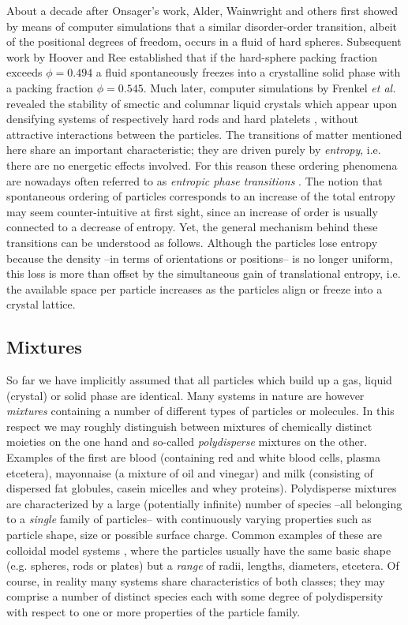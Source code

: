 \documentclass[amssymb]{revtex4}
\begin{document}
About a decade after Onsager's work, Alder, Wainwright and others \cite{ALDER57,WOOD57} first showed by means of computer simulations that
a similar disorder-order transition, albeit of the positional degrees of freedom, occurs in a fluid of hard spheres. Subsequent work by
Hoover and Ree \cite{HooverRee} established that if the hard-sphere packing fraction  
exceeds $\phi=0.494$ a fluid  spontaneously freezes into a crystalline 
solid phase with a packing fraction $\phi=0.545$.
Much later, computer simulations by Frenkel {\em et al.}  revealed the stability
of smectic and columnar liquid crystals which appear upon densifying systems of respectively hard rods \cite{Frenkel88} and 
 hard platelets \cite{FrenkelLiqcryst,Veerman},  without  attractive interactions between the particles. 
The transitions of matter mentioned here share an important characteristic; they are driven purely by {\em entropy}, i.e. there are no energetic effects involved.
For this reason these ordering phenomena are nowadays 
often referred to as {\em entropic phase transitions} \cite{Frenkelsoft}. 
The notion that spontaneous ordering
of particles corresponds to an increase of the total entropy  may seem counter-intuitive 
at first sight, since an increase  of order is usually connected to a decrease of entropy.
Yet, the general mechanism behind these transitions can be understood as follows.
Although the particles lose entropy because the density --in terms of orientations or positions--
is no longer uniform, this loss is more than offset by the simultaneous gain of translational
entropy, i.e.  the available space per particle increases as the particles align or freeze into
a crystal lattice.

\subsection{Mixtures}

So far we have implicitly assumed that all particles which build up a gas, liquid (crystal) or solid phase 
are identical. Many systems in nature are however {\em mixtures} containing a number of different types of
particles or molecules. In this respect we may roughly distinguish 
between mixtures of chemically distinct moieties on the one hand and so-called {\em polydisperse} mixtures on
the other. Examples of the first are blood 
(containing red and white blood cells, plasma etcetera),
mayonnaise (a mixture of oil and vinegar) and milk (consisting of dispersed fat globules, casein micelles and
whey proteins). 
Polydisperse mixtures are characterized by a large (potentially infinite) number of 
species --all belonging to a {\em single} family of particles-- with  continuously varying properties such as particle shape, size or possible surface charge. 
Common examples of these are colloidal model systems , where the particles usually have the same
basic shape (e.g.  spheres, rods or plates) but  a {\em range} of 
radii, lengths, diameters, etcetera. Of course, in reality many systems
share characteristics of both classes; they
may comprise a number of distinct species  each with some degree of polydispersity with respect to
one or more properties of the particle family.
\end{document}

